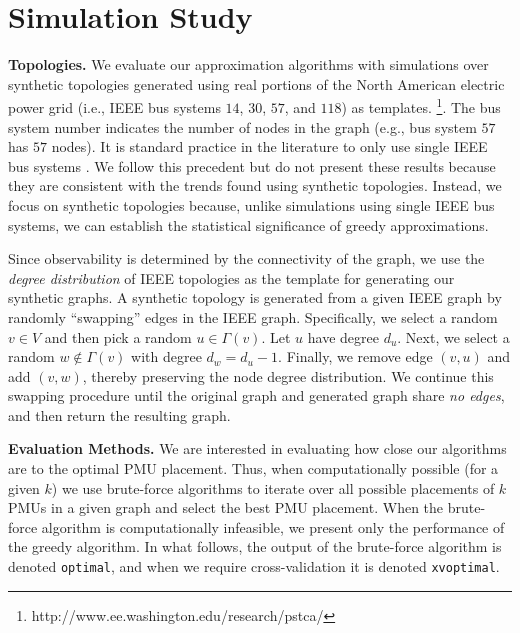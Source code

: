 \section{Simulation Study}
\label{sec:simulations}

\textbf{Topologies.} 
We evaluate our approximation algorithms with simulations over synthetic topologies generated using real portions of the North American electric power grid 
(i.e., IEEE bus systems $14$, $30$, $57$, and $118$) as templates. {\footnote {\small http://www.ee.washington.edu/research/pstca/}}. 
The bus system number indicates the number of nodes in the graph (e.g., bus system $57$ has $57$ nodes).
It is standard practice in the literature to only use single IEEE bus systems \cite{Baldwin93,Abur06,Mili90,Xu04}.  
We follow this precedent but do not present these results because they are consistent with the trends found using synthetic topologies.
Instead, we focus on synthetic topologies because, unlike simulations using single IEEE bus systems, we can establish the statistical significance of greedy approximations.

Since observability is determined by the connectivity of the graph, we use the {\em degree distribution} of IEEE topologies as the template for generating our synthetic graphs.
A synthetic topology is generated from a given IEEE graph by randomly ``swapping'' edges in the IEEE graph. Specifically, we select a random $v \in V$ and then pick a random $u \in \Gamma(v)$. 
Let $u$ have degree $d_u$.  Next, we select a random $w \notin \Gamma(v)$ with degree $d_w = d_u -1$. %
Finally, we remove edge $(v,u)$ and add $(v,w)$, thereby preserving the node degree distribution.
We continue this swapping procedure until the original graph and generated graph share {\em no edges}, and then return the resulting graph.

\textbf{Evaluation Methods.}
We are interested in evaluating how close our algorithms are to the optimal PMU placement. 
Thus, when computationally possible (for a given $k$) we use brute-force algorithms to iterate over all possible placements of $k$ PMUs in a given graph and select the best PMU placement. 
When the brute-force algorithm is computationally infeasible, we present only the performance of the greedy algorithm.
In what follows, the output of the brute-force algorithm is denoted {\tt optimal}, and when we require cross-validation it is denoted {\tt xvoptimal}.



